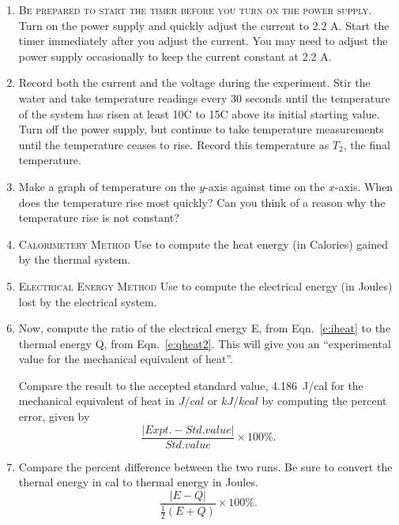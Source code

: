 \begin{enumerate}
\item
\textsc{Be prepared to start the timer before you turn on the power supply.}
Turn on the power supply and quickly adjust the current to 2.2 A.  Start the timer immediately after you adjust the current.  You may need to adjust the power supply occasionally to keep the current constant at 2.2 A.  

\item
Record both the current and the voltage during the experiment.  Stir the water and take temperature readings every 30 seconds until the temperature of the system has risen at least 10\degree C to 15\degree C above its initial starting value.  Turn off the power supply, but continue to take temperature measurements until the temperature ceases to rise. Record this temperature as $T_2$, the final temperature.

\item
Make a graph of temperature on the $y$-axis against time on the $x$-axis.  When does the temperature rise most quickly?  Can you think of a reason why the temperature rise is not constant?

\item
\textsc{Calorimetery Method}  Use  to compute the heat energy (in Calories) gained by the thermal system. 

\item
\textsc{Electrical Energy Method}  Use  to compute the electrical energy (in Joules) lost by the electrical system.

\item
Now, compute the ratio of the electrical energy E, from Eqn.~\ref{e:iheat} to the thermal energy Q, from Eqn.~\ref{e:qheat2}.  This will give you an ``experimental value for the mechanical equivalent of heat''.

Compare the result to the accepted standard value, \SI{4.186}{J/cal} for the mechanical equivalent of heat 
in $J/cal$ or $kJ/kcal$ by computing the percent error, given by
\[ \frac{|Expt. - Std. value|}{Std. value} \times 100\%. \]

\item Compare the percent difference between the two runs. Be sure to convert the thernal energy in cal to thermal energy in Joules.
\[ \frac{|E - Q|}{\frac{1}{2}(E+Q)} \times 100\%. \]

\end{enumerate}

